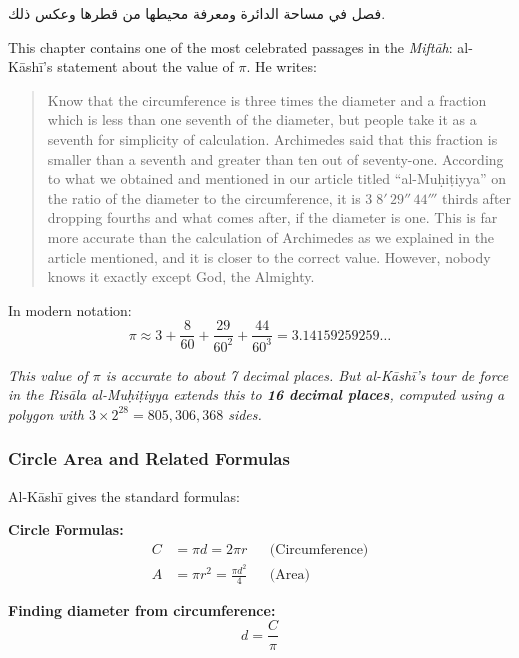 \documentclass[11pt,a4paper]{article}
\newenvironment{arabicbox}{%
  \begin{framed}
  \begin{minipage}{\dimexpr\linewidth-2\fboxsep-2\fboxrule\relax}
  \setlength{\parindent}{0pt}
  \linespread{1.3}\selectfont
}{%
  \end{minipage}
  \end{framed}
}
\newenvironment{mathalgo}{%
  \par\vspace{0.3cm}
  \begin{framed}
  \setlength{\parindent}{0pt}
}{%
  \end{framed}
  \par\vspace{0.3cm}
}
\newcommand{\cnote}[1]{\textcolor{notecolor}{\textit{#1}}}
\begin{document}
\begin{arabicbox}
\begin{Arabic}
فصل في مساحة الدائرة ومعرفة محيطها من قطرها وعكس ذلك.
\end{Arabic}
\end{arabicbox}

\vspace{0.3cm}

This chapter contains one of the most celebrated passages in the
\textit{Mift\=ah}: al-K\=ash\=i's statement about the value of $\pi$. He
writes:

\begin{quote}
Know that the circumference is three times the diameter and a fraction
which is less than one seventh of the diameter, but people take it as a
seventh for simplicity of calculation. Archimedes said that this
fraction is smaller than a seventh and greater than ten out of
seventy-one. According to what we obtained and mentioned in our article
titled ``al-Mu\d{h}i\d{t}iyya'' on the ratio of the diameter to the
circumference, it is $3\;8'\,29''\,44'''$ thirds after dropping fourths
and what comes after, if the diameter is one. This is far more accurate
than the calculation of Archimedes as we explained in the article
mentioned, and it is closer to the correct value. However, nobody knows
it exactly except God, the Almighty.
\end{quote}

\noindent In modern notation:
\[
\pi \approx 3 + \frac{8}{60} + \frac{29}{60^2} + \frac{44}{60^3} =
3.14159259259\ldots
\]

\cnote{This value of $\pi$ is accurate to about 7 decimal places. But
al-K\=ash\=i's tour de force in the \textit{Ris\=ala al-Mu\d{h}i\d{t}iyya}
extends this to \textbf{16 decimal places}, computed using a polygon with
$3 \times 2^{28} = 805{,}306{,}368$ sides.}

\subsubsection{Circle Area and Related Formulas}

Al-K\=ash\=i gives the standard formulas:

\begin{mathalgo}
\textbf{Circle Formulas:}
\begin{align*}
C &= \pi d = 2\pi r && \text{(Circumference)} \\
A &= \pi r^2 = \frac{\pi d^2}{4} && \text{(Area)}
\end{align*}

\textbf{Finding diameter from circumference:}
\[
d = \frac{C}{\pi}
\]
\end{mathalgo}
\end{document}
